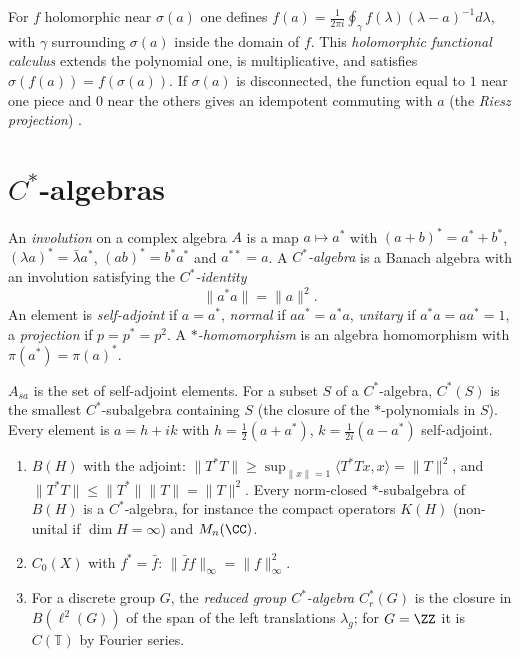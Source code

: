\begin{remark}\label{operator-algebras:remark-holomorphic-calculus}
For $f$ holomorphic near $\sigma(a)$ one defines $f(a) = \frac{1}{2\pi i}\oint_\gamma f(\lambda)(\lambda - a)^{-1}d\lambda$, with $\gamma$ surrounding $\sigma(a)$ inside the domain of $f$. This \emph{holomorphic functional calculus}
extends the polynomial one, is multiplicative, and satisfies $\sigma(f(a)) = f(\sigma(a))$. If $\sigma(a)$ is disconnected, the function equal to $1$ near one piece and $0$ near the others gives an idempotent commuting with
$a$ (the \emph{Riesz projection}) \cite{murphy-cstar}.
\end{remark}

\section{$C^*$-algebras}\label{operator-algebras:section-cstar}

\begin{definition}\label{operator-algebras:definition-cstar}
An \emph{involution} on a complex algebra $A$ is a map $a \mapsto a^*$ with $(a + b)^* = a^* + b^*$, $(\lambda a)^* = \bar\lambda a^*$, $(ab)^* = b^*a^*$ and $a^{**} = a$. A \emph{$C^*$-algebra} is a Banach algebra with an
involution satisfying the \emph{$C^*$-identity}
\[
\|a^*a\| = \|a\|^2.
\]
An element is \emph{self-adjoint} if $a = a^*$, \emph{normal} if $aa^* = a^*a$, \emph{unitary} if $a^*a = aa^* = 1$, a \emph{projection} if $p = p^* = p^2$. A \emph{$*$-homomorphism} is an algebra homomorphism with
$\pi(a^*) = \pi(a)^*$.
\end{definition}

\begin{notation}\label{operator-algebras:notation-cstar}
$A_{sa}$ is the set of self-adjoint elements. For a subset $S$ of a $C^*$-algebra, $C^*(S)$ is the smallest $C^*$-subalgebra containing $S$ (the closure of the $*$-polynomials in $S$). Every element is $a = h + ik$
with $h = \frac12(a + a^*)$, $k = \frac{1}{2i}(a - a^*)$ self-adjoint.
\end{notation}

\begin{example}\label{operator-algebras:example-cstar}
\begin{enumerate}
\item $B(H)$ with the adjoint: $\|T^*T\| \geq \sup_{\|x\| = 1}\langle T^*Tx, x\rangle = \|T\|^2$, and $\|T^*T\| \leq \|T^*\|\|T\| = \|T\|^2$. Every norm-closed $*$-subalgebra of $B(H)$ is a $C^*$-algebra, for instance the
compact operators $K(H)$ (non-unital if $\dim H = \infty$) and $M_n(\CC)$.
\item $C_0(X)$ with $f^* = \bar f$: $\|\bar ff\|_\infty = \|f\|_\infty^2$.
\item For a discrete group $G$, the \emph{reduced group $C^*$-algebra} $C_r^*(G)$ is the closure in $B(\ell^2(G))$ of the span of the left translations $\lambda_g$; for $G = \ZZ$ it is $C(\mathbb{T})$ by Fourier series.
\end{enumerate}
\end{example}

